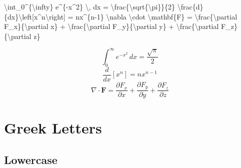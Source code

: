 \documentclass[
  letterpaper,
  DIV=11,
  numbers=noendperiod]{scrartcl}
\newenvironment{Shaded}{\begin{snugshade}}{\end{snugshade}}
\newcommand{\SpecialCharTok}[1]{\textcolor[rgb]{0.37,0.37,0.37}{#1}}
\newcommand{\SpecialStringTok}[1]{\textcolor[rgb]{0.13,0.47,0.30}{#1}}
\begin{document}
\begin{Shaded}
\begin{Highlighting}[]
\SpecialStringTok{$$}\SpecialCharTok{\textbackslash{}int}\SpecialStringTok{\_0\^{}\{}\SpecialCharTok{\textbackslash{}infty}\SpecialStringTok{\} e\^{}\{{-}x\^{}2\} }\SpecialCharTok{\textbackslash{},}\SpecialStringTok{ dx = }\SpecialCharTok{\textbackslash{}frac}\SpecialStringTok{\{}\SpecialCharTok{\textbackslash{}sqrt}\SpecialStringTok{\{}\SpecialCharTok{\textbackslash{}pi}\SpecialStringTok{\}\}\{2\}$$}
\SpecialStringTok{$$}\SpecialCharTok{\textbackslash{}frac}\SpecialStringTok{\{d\}\{dx\}}\SpecialCharTok{\textbackslash{}left}\SpecialStringTok{[x\^{}n}\SpecialCharTok{\textbackslash{}right}\SpecialStringTok{] = nx\^{}\{n{-}1\}$$}
\SpecialStringTok{$$}\SpecialCharTok{\textbackslash{}nabla}\SpecialStringTok{ }\SpecialCharTok{\textbackslash{}cdot}\SpecialStringTok{ }\SpecialCharTok{\textbackslash{}mathbf}\SpecialStringTok{\{F\} = }\SpecialCharTok{\textbackslash{}frac}\SpecialStringTok{\{}\SpecialCharTok{\textbackslash{}partial}\SpecialStringTok{ F\_x\}\{}\SpecialCharTok{\textbackslash{}partial}\SpecialStringTok{ x\} + }\SpecialCharTok{\textbackslash{}frac}\SpecialStringTok{\{}\SpecialCharTok{\textbackslash{}partial}\SpecialStringTok{ F\_y\}\{}\SpecialCharTok{\textbackslash{}partial}\SpecialStringTok{ y\} + }\SpecialCharTok{\textbackslash{}frac}\SpecialStringTok{\{}\SpecialCharTok{\textbackslash{}partial}\SpecialStringTok{ F\_z\}\{}\SpecialCharTok{\textbackslash{}partial}\SpecialStringTok{ z\}$$}
\end{Highlighting}
\end{Shaded}

\[\int_0^{\infty} e^{-x^2} \, dx = \frac{\sqrt{\pi}}{2}\]
\[\frac{d}{dx}\left[x^n\right] = nx^{n-1}\]
\[\nabla \cdot \mathbf{F} = \frac{\partial F_x}{\partial x} + \frac{\partial F_y}{\partial y} + \frac{\partial F_z}{\partial z}\]

\hypertarget{greek-letters}{%
\section{Greek Letters}\label{greek-letters}}

\hypertarget{lowercase}{%
\subsection{Lowercase}\label{lowercase}}
\end{document}
